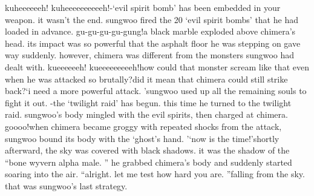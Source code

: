 kuheeeeeeh! kuheeeeeeeeeeh!-‘evil spirit bomb’ has been embedded in your weapon.
it wasn’t the end.
 sungwoo fired the 20 ‘evil spirit bombs’ that he had loaded in advance.
gu-gu-gu-gu-gung!a black marble exploded above chimera’s head.
 its impact was so powerful that the asphalt floor he was stepping on gave way suddenly.
however, chimera was different from the monsters sungwoo had dealt with.
kueeeeeeh! kueeeeeeeeeh!how could that monster scream like that even when he was attacked so brutally?did it mean that chimera could still strike back?‘i need a more powerful attack.
’sungwoo used up all the remaining souls to fight it out.
-the ‘twilight raid’ has begun.
this time he turned to the twilight raid.
 sungwoo’s body mingled with the evil spirits, then charged at chimera.
goooo!when chimera became groggy with repeated shocks from the attack, sungwoo bound its body with the ‘ghost’s hand.
’‘now is the time!’shortly afterward, the sky was covered with black shadows.
 it was the shadow of the “bone wyvern alpha male.
” he grabbed chimera’s body and suddenly started soaring into the air.
“alright.
 let me test how hard you are.
”falling from the sky.
 that was sungwoo’s last strategy.

